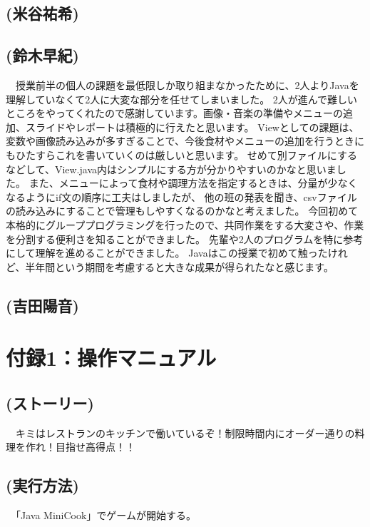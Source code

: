\documentclass[a4j]{jarticle} %
\begin{document}
\subsection*{(米谷祐希)}
\subsection*{(鈴木早紀)}
　授業前半の個人の課題を最低限しか取り組まなかったために、2人よりJavaを理解していなくて2人に大変な部分を任せてしまいました。
2人が進んで難しいところをやってくれたので感謝しています。画像・音楽の準備やメニューの追加、スライドやレポートは積極的に行えたと思います。
Viewとしての課題は、変数や画像読み込みが多すぎることで、今後食材やメニューの追加を行うときにもひたすらこれを書いていくのは厳しいと思います。
せめて別ファイルにするなどして、View.java内はシンプルにする方が分かりやすいのかなと思いました。
また、メニューによって食材や調理方法を指定するときは、分量が少なくなるようにif文の順序に工夫はしましたが、
他の班の発表を聞き、csvファイルの読み込みにすることで管理もしやすくなるのかなと考えました。
今回初めて本格的にグループプログラミングを行ったので、共同作業をする大変さや、作業を分割する便利さを知ることができました。
先輩や2人のプログラムを特に参考にして理解を進めることができました。
Javaはこの授業で初めて触ったけれど、半年間という期間を考慮すると大きな成果が得られたなと感じます。
\subsection*{(吉田陽音)}


\newpage
\section*{付録1：操作マニュアル}
\subsection*{(ストーリー)}
　キミはレストランのキッチンで働いているぞ！制限時間内にオーダー通りの料理を作れ！目指せ高得点！！
\subsection*{(実行方法)}
　「Java MiniCook」でゲームが開始する。
\end{document}
